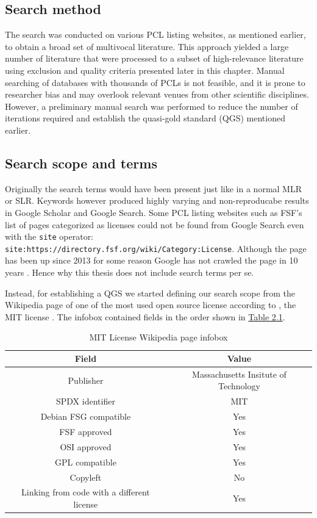 \subsection{Search method}
The search was conducted on various PCL listing websites, as mentioned earlier, to obtain a broad set of multivocal literature. This approach yielded a large number of literature that were processed to a subset of high-relevance literature using exclusion and quality criteria presented later in this chapter. Manual searching of databases with thousands of PCLs is not feasible, and it is prone to researcher bias and may overlook relevant venues from other scientific disciplines. However, a preliminary manual search was performed to reduce the number of iterations required and establish the quasi-gold standard (QGS) mentioned earlier.
\subsection{Search scope and terms}
Originally the search terms would have been present just like in a normal MLR or SLR. Keywords however produced highly varying and non-reproducabe results in Google Scholar and Google Search. Some PCL listing websites such as FSF's list of pages categorized as licenses could not be found from Google Search even with the \texttt{site} operator: \texttt{site:https://directory.fsf.org/wiki/Category:License}. Although the page has been up since 2013 for some reason Google has not crawled the page in 10 years \citep{fsf:licenselist}. Hence why this thesis does not include search terms per se.

Instead, for establishing a QGS we started defining our search scope from the Wikipedia page of one of the most used open source license according to \cite{github:licenseusage}, the MIT license \citep{wikipedia:mit}. The infobox contained fields in the order shown in \hyperref[table:infobox]{Table 2.1}.

\begin{table}[t]
	\begin{center}
		\begin{tabular}{||c c||}
			\hline
			Field & Value \\
			\hline
			Publisher & Massachusetts Insitute of Technology \\
			SPDX identifier & MIT \\
			Debian FSG compatible & Yes \\
			FSF approved & Yes \\
			OSI approved & 	Yes \\
			GPL compatible & Yes \\
			Copyleft & No \\
			Linking from code with a different license & Yes \\
			\hline
		\end{tabular}
		\caption{MIT License Wikipedia page infobox}
		\label{table:infobox}
	\end{center}
\end{table}

